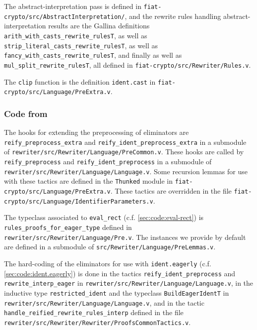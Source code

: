 \begin{subappendices}
The abstract-interpretation pass is defined in \texttt{fiat-crypto/src/AbstractInterpretation/}, and the rewrite rules handling abstract-interpretation results are the Gallina definitions \verb|arith_with_casts_rewrite_rulesT|, as well as \verb|strip_literal_casts_rewrite_rulesT|, as well as \verb|fancy_with_casts_rewrite_rulesT|, and finally as well as \verb|mul_split_rewrite_rulesT|, all defined in \texttt{fiat-crypto/src/Rewriter/Rules.v}.

The \verb|clip| function is the definition \verb|ident.cast| in \texttt{fiat-crypto/src/Language/PreExtra.v}.

\subsubsection{Code from } \label{sec:code-from-implementation-and-usage}

The \Ltac{} hooks for extending the preprocessing of eliminators are \texttt{reify_preprocess_extra} and \texttt{reify_ident_preprocess_extra} in a submodule of \texttt{rewriter/src/Rewriter/Language/PreCommon.v}.
These hooks are called by \texttt{reify_preprocess} and \texttt{reify_ident_preprocess} in a submodule of \texttt{rewriter/src/Rewriter/Language/Language.v}.
Some recursion lemmas for use with these tactics are defined in the \verb|Thunked| module in \texttt{fiat-crypto/src/Language/PreExtra.v}.
These tactics are overridden in the file \texttt{fiat-crypto/src/Language/IdentifierParameters.v}.

The typeclass associated to \texttt{eval_rect} ({c.f.} \autoref{sec:code:eval-rect}) is \texttt{rules_proofs_for_eager_type} defined in \texttt{rewriter/src/Rewriter/Language/Pre.v}.
The instances we provide by default are defined in a submodule of \texttt{src/Rewriter/Language/PreLemmas.v}.

The hard-coding of the eliminators for use with \texttt{ident.eagerly} ({c.f.} \autoref{sec:code:ident.eagerly}) is done in the tactics \texttt{reify_ident_preprocess} and \texttt{rewrite_interp_eager} in \texttt{rewriter/src/Rewriter/Language/Language.v}, in the inductive type \texttt{restricted_ident} and the typeclass \texttt{BuildEagerIdentT} in \texttt{rewriter/src/Rewriter/Language/Language.v}, and in the \Ltac{} tactic \texttt{handle_reified_rewrite_rules_interp} defined in the file \texttt{rewriter/src/Rewriter/Rewriter/ProofsCommonTactics.v}.


\end{subappendices}
